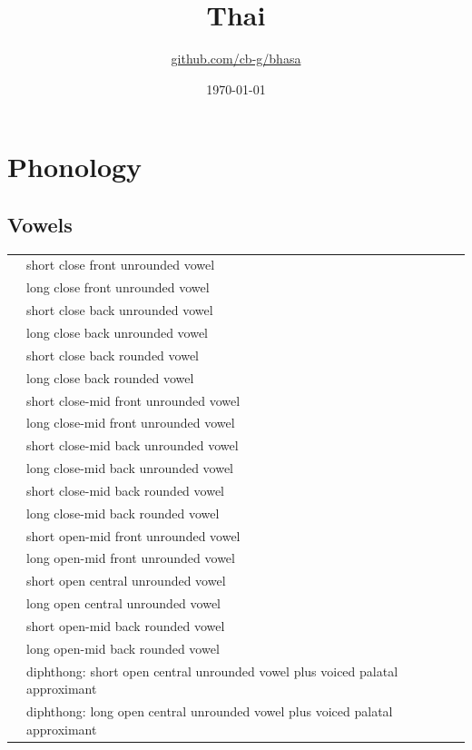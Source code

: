 \documentclass{article}
\title{Thai\\\ipa{[p\super ha:\tone{333}sa:\tone{324}t\super haj\tone{333}]}}
\author{\href{https://github.com/cb-g/bhasa}{github.com/cb-g/bhasa}}
\date{\today}
\begin{document}
\pagecolor{custom_bg}\color{custom_fg}
\maketitle\thispagestyle{empty}

\newpage\setcounter{page}{1}\section{Phonology}

\subsection{Vowels}

\begin{xltabular}{\textwidth}{lL}
   & short close front unrounded vowel \\
   & long close front unrounded vowel \\
   & short close back unrounded vowel \\
   & long close back unrounded vowel \\
   & short close back rounded vowel \\
   & long close back rounded vowel \\
   & short close-mid front unrounded vowel \\
   & long close-mid front unrounded vowel \\
   & short close-mid back unrounded vowel \\
   & long close-mid back unrounded vowel \\
   & short close-mid back rounded vowel \\
   & long close-mid back rounded vowel \\
   & short open-mid front unrounded vowel \\
   & long open-mid front unrounded vowel \\
   & short open central unrounded vowel \\
   & long open central unrounded vowel \\
   & short open-mid back rounded vowel \\
   & long open-mid back rounded vowel \\
   & diphthong: short open central unrounded vowel plus voiced palatal approximant \\
   & diphthong: long open central unrounded vowel plus voiced palatal approximant \\

\end{xltabular}
\end{document}
